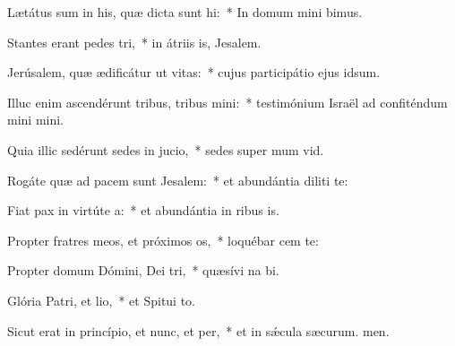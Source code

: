\item Lætátus sum in his, quæ dicta sunt hi:~* In domum mini bimus.
\item Stantes erant pedes tri,~* in átriis is, Jesalem.
\item Jerúsalem, quæ ædificátur ut vitas:~* cujus participátio ejus  idsum.
\item Illuc enim ascendérunt tribus, tribus mini:~* testimónium Israël ad confiténdum mini mini.
\item Quia illic sedérunt sedes in jucio,~* sedes super mum vid.
\item Rogáte quæ ad pacem sunt Jesalem:~* et abundántia diliti te:
\item Fiat pax in virtúte a:~* et abundántia in ribus is.
\item Propter fratres meos, et próximos os,~* loquébar cem  te:
\item Propter domum Dómini, Dei tri,~* quæsívi na bi.
\item Glória Patri, et lio,~* et Spitui to.
\item Sicut erat in princípio, et nunc, et per,~* et in sǽcula sæcurum. men.
